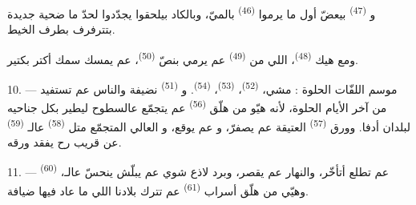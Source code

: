و \textsuperscript{(47)} بيعضّ  أول ما
يرموا  \textsuperscript{(46)} بالميّ، وبالكاد بيلحقوا
يجدّدوا  لحدّ ما ضحية جديدة بتترفرف بطرف الخيط.

ومع هيك  \textsuperscript{(48)}، اللي من
 \textsuperscript{(49)} عم يرمي  بنصّ
 \textsuperscript{(50)}، عم يمسك سمك أكتر بكتير.

10. ---  موسم اللفّات الحلوة : مشي، 
\textsuperscript{(52)}،  \textsuperscript{(53)}،
 \textsuperscript{(54)}. و
\textsuperscript{(51)} نضيفة والناس عم تستفيد من آخر الأيام الحلوة، لأنه
هيّو من هلّق  \textsuperscript{(56)} عم يتجمّع عالسطوح
ليطير بكل جناحيه لبلدان أدفا. وورق 
\textsuperscript{(57)} العتيقة عم يصفرّ، و عم يوقع،
و العالي المتجمّع متل  \textsuperscript{(58)}
عالـ \textsuperscript{(59)} عن قريب رح يفقد ورقه.

11. ---  \textsuperscript{(60)} عم تطلع أتأخّر، والنهار عم
يقصر، وبرد لاذع شوي عم يبلّش ينحسّ عالـ، وهيّي من هلّق
أسراب  \textsuperscript{(61)} عم تترك بلادنا اللي ما عاد
فيها ضيافة.

\VUsaut{6.0mm}
\VUfilet{22mm}
